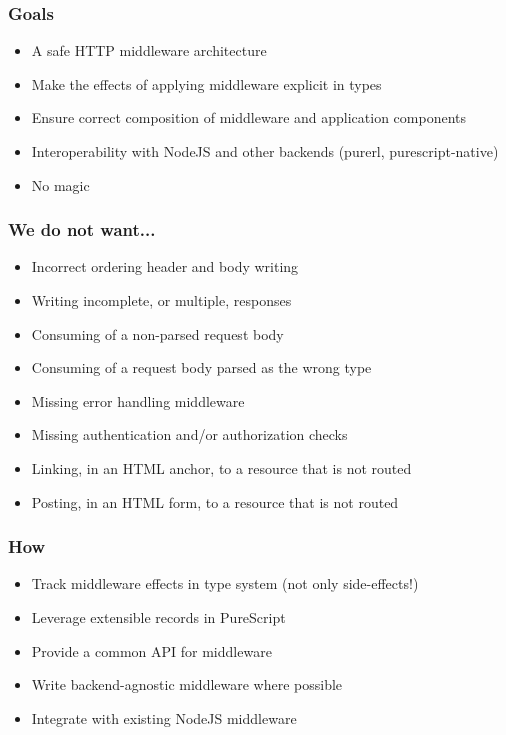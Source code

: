 \begin{frame}
  \titlepage
\end{frame}

\begin{frame}
\end{frame}

\begin{frame}
  \frametitle{Goals}
  \begin{itemize}
    \item A safe HTTP middleware architecture
    \item Make the effects of applying middleware explicit in types
    \item Ensure correct composition of middleware and application components
    \item Interoperability with NodeJS and other backends (purerl, purescript-native)
    \item No magic
  \end{itemize}
\end{frame}

\begin{frame}
  \frametitle{We do not want...}
  \begin{itemize}
    \item Incorrect ordering header and body writing
    \item Writing incomplete, or multiple, responses
    \item Consuming of a non-parsed request body
    \item Consuming of a request body parsed as the wrong type
    \item Missing error handling middleware
    \item Missing authentication and/or authorization checks
    \item Linking, in an HTML anchor, to a resource that is not routed
    \item Posting, in an HTML form, to a resource that is not routed
  \end{itemize}
\end{frame}

\begin{frame}
  \frametitle{How}
  \begin{itemize}
    \item Track middleware effects in type system (not only side-effects!)
    \item Leverage extensible records in PureScript
    \item Provide a common API for middleware
    \item Write backend-agnostic middleware where possible
    \item Integrate with existing NodeJS middleware
  \end{itemize}
\end{frame}

